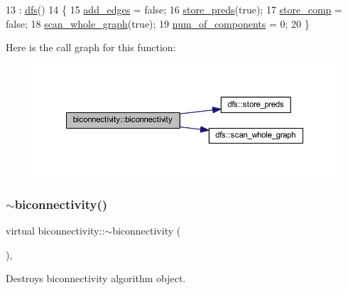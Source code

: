 \begin{DoxyCode}
13                                : \mbox{\hyperlink{classdfs_afe4e213d3f1f88a4ff57b2d72de232f4}{dfs}}()
14 \{
15     \mbox{\hyperlink{classbiconnectivity_a70c1310b4ba83dbe10594f3a33f94763}{add\_edges}} = \textcolor{keyword}{false};
16     \mbox{\hyperlink{classdfs_ad0233128f2958d630102096aa6f3b9ef}{store\_preds}}(\textcolor{keyword}{true});
17     \mbox{\hyperlink{classbiconnectivity_a989307b07f4a976649bd7551173bd564}{store\_comp}} = \textcolor{keyword}{false};
18     \mbox{\hyperlink{classdfs_a025ed2d6101a7b9f72578a52b484ef50}{scan\_whole\_graph}}(\textcolor{keyword}{true});
19     \mbox{\hyperlink{classbiconnectivity_a89fbd540b8a61aad150020be657ddfb7}{num\_of\_components}} = 0;
20 \}
\end{DoxyCode}
Here is the call graph for this function\+:\nopagebreak
\begin{figure}[H]
\begin{center}
\leavevmode
\includegraphics[width=350pt]{classbiconnectivity_a2ac204c72d74090e4e24e83a98351f6a_cgraph}
\end{center}
\end{figure}
\mbox{\label{classbiconnectivity_af8e2bb061de4a08f95a2a3a94fdbd797}} 
\subsubsection{\texorpdfstring{$\sim$biconnectivity()}{~biconnectivity()}}
{\footnotesize\ttfamily virtual biconnectivity\+::$\sim$biconnectivity (\begin{DoxyParamCaption}{ }\end{DoxyParamCaption})\hspace{0.3cm}{\ttfamily [inline]}, {\ttfamily [virtual]}}



Destroys biconnectivity algorithm object. 

